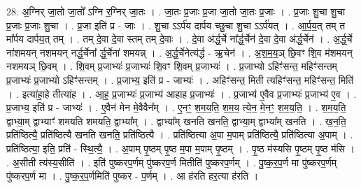 \documentclass[17pt]{extarticle}
\begin{document}
28. अ॒ग्निर् जा॒तो जा॒तो᳚ ऽग्नि र॒ग्निर् जा॒तः । . जा॒तः प्र॒जाः प्र॒जा जा॒तो जा॒तः प्र॒जाः । . प्र॒जाः शु॒चा शु॒चा प्र॒जाः प्र॒जाः शु॒चा । . प्र॒जा इति॑ प्र - जाः । . शु॒चा ऽऽर्प॑य दार्पय च्छु॒चा शु॒चा ऽऽर्प॑यत् । . आ॒र्प॒य॒त् तम् त मा᳚र्पय दार्पय॒त् तम् । . तम् दे॒वा दे॒वा स्तम् तम् दे॒वाः । . दे॒वा अ॑र्द्ध॒र्चे ना᳚र्द्ध॒र्चेन॑ दे॒वा दे॒वा अ॑र्द्ध॒र्चेन॑ । . अ॒र्द्ध॒र्चे ना॑शमयन् नशमयन् नर्द्ध॒र्चेना᳚ र्द्ध॒र्चेना॑ शमयन्न् । . अ॒र्द्ध॒र्चेनेत्य॑र्द्ध - ऋ॒चेन॑ । . अ॒श॒म॒य॒ञ् छि॒वꣳ शि॒व म॑शमयन् नशमयञ् छि॒वम् । . शि॒वम् प्र॒जाभ्यः॑ प्र॒जाभ्यः॑ शि॒वꣳ शि॒वम् प्र॒जाभ्यः॑ । . प्र॒जाभ्यो ऽहिꣳ॑सन्त॒ महिꣳ॑सन्तम् प्र॒जाभ्यः॑ प्र॒जाभ्यो ऽहिꣳ॑सन्तम् । . प्र॒जाभ्य॒ इति॑ प्र - जाभ्यः॑ । . अहिꣳ॑सन्त॒ मिती त्यहिꣳ॑सन्त॒ महिꣳ॑सन्त॒ मिति॑ । . इत्या॑हा॒हे तीत्या॑ह । . आ॒ह॒ प्र॒जाभ्यः॑ प्र॒जाभ्य॑ आहाह प्र॒जाभ्यः॑ । . प्र॒जाभ्य॑ ए॒वैव प्र॒जाभ्यः॑ प्र॒जाभ्य॑ ए॒व । . प्र॒जाभ्य॒ इति॑ प्र - जाभ्यः॑ । . ए॒वैन॑ मेन मे॒वैवैन᳚म् । . ए॒नꣳ॒॒ श॒म॒य॒ति॒ श॒म॒य॒ त्ये॒न॒ मे॒नꣳ॒॒ श॒म॒य॒ति॒ । . श॒म॒य॒ति॒ द्वाभ्या॒म् द्वाभ्याꣳ॑ शमयति शमयति॒ द्वाभ्या᳚म् । . द्वाभ्या᳚म् खनति खनति॒ द्वाभ्या॒म् द्वाभ्या᳚म् खनति । . ख॒न॒ति॒ प्रति॑ष्ठित्यै॒ प्रति॑ष्ठित्यै खनति खनति॒ प्रति॑ष्ठित्यै । . प्रति॑ष्ठित्या अ॒पा म॒पाम् प्रति॑ष्ठित्यै॒ प्रति॑ष्ठित्या अ॒पाम् । . प्रति॑ष्ठित्या॒ इति॒ प्रति॑ - स्थि॒त्यै॒ । . अ॒पाम् पृ॒ष्ठम् पृ॒ष्ठ म॒पा म॒पाम् पृ॒ष्ठम् । . पृ॒ष्ठ म॑स्यसि पृ॒ष्ठम् पृ॒ष्ठ म॑सि । . अ॒सीती त्य॑स्य॒सीति॑ । . इति॑ पुष्करप॒र्णम् पु॑ष्करप॒र्ण मितीति॑ पुष्करप॒र्णम् । . पु॒ष्क॒र॒प॒र्ण मा पु॑ष्करप॒र्णम् पु॑ष्करप॒र्ण मा । . पु॒ष्क॒र॒प॒र्णमिति॑ पुष्कर - प॒र्णम् । . आ ह॑रति हर॒त्या ह॑रति । \newline
\end{document}

